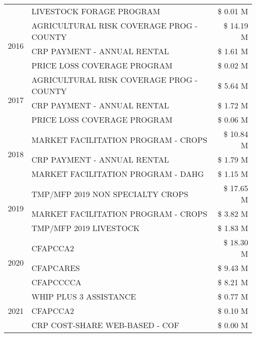 \begin{tabular}{llr}
 & LIVESTOCK FORAGE PROGRAM & \$ 0.01 M \\
\cline{1-3}
\multirow[t]{3}{*}{2016} & AGRICULTURAL RISK COVERAGE PROG - COUNTY & \$ 14.19 M \\
 & CRP PAYMENT - ANNUAL RENTAL & \$ 1.61 M \\
 & PRICE LOSS COVERAGE PROGRAM & \$ 0.02 M \\
\cline{1-3}
\multirow[t]{3}{*}{2017} & AGRICULTURAL RISK COVERAGE PROG - COUNTY & \$ 5.64 M \\
 & CRP PAYMENT - ANNUAL RENTAL & \$ 1.72 M \\
 & PRICE LOSS COVERAGE PROGRAM & \$ 0.06 M \\
\cline{1-3}
\multirow[t]{3}{*}{2018} & MARKET FACILITATION PROGRAM - CROPS & \$ 10.84 M \\
 & CRP PAYMENT - ANNUAL RENTAL & \$ 1.79 M \\
 & MARKET FACILITATION PROGRAM - DAHG & \$ 1.15 M \\
\cline{1-3}
\multirow[t]{3}{*}{2019} & TMP/MFP 2019 NON SPECIALTY CROPS & \$ 17.65 M \\
 & MARKET FACILITATION PROGRAM - CROPS & \$ 3.82 M \\
 & TMP/MFP 2019 LIVESTOCK & \$ 1.83 M \\
\cline{1-3}
\multirow[t]{3}{*}{2020} & CFAPCCA2 & \$ 18.30 M \\
 & CFAPCARES & \$ 9.43 M \\
 & CFAPCCCCA & \$ 8.21 M \\
\cline{1-3}
\multirow[t]{3}{*}{2021} & WHIP PLUS 3 ASSISTANCE & \$ 0.77 M \\
 & CFAPCCA2 & \$ 0.10 M \\
 & CRP COST-SHARE WEB-BASED - COF & \$ 0.00 M \\
\cline{1-3}
\bottomrule
\end{tabular}
